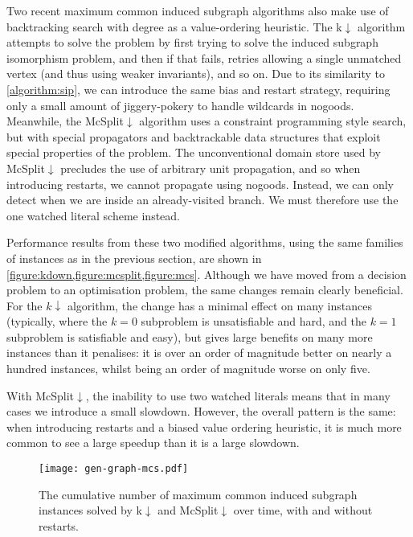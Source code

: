 \documentclass{article}
\newcommand{\citep}[1]{\cite{#1}}
\begin{document}
Two recent maximum common induced subgraph algorithms also make use of backtracking search with
degree as a value-ordering heuristic. The k${\downarrow}$ algorithm
\citep{DBLP:conf/aaai/HoffmannMR17} attempts to solve the problem by first trying to solve the
induced subgraph isomorphism problem, and then if that fails, retries allowing a single unmatched
vertex (and thus using weaker invariants), and so on. Due to its similarity to \cref{algorithm:sip},
we can introduce the same bias and restart strategy, requiring only a small amount of jiggery-pokery
to handle wildcards in nogoods.  Meanwhile, the McSplit${\downarrow}$ algorithm
\citep{DBLP:conf/ijcai/McCreeshPT17} uses a constraint programming style search, but with special
propagators and backtrackable data structures that exploit special properties of the problem. The
unconventional domain store used by McSplit${\downarrow}$ precludes the use of arbitrary unit propagation, and so
when introducing restarts, we cannot propagate using nogoods.  Instead, we can only detect when we
are inside an already-visited branch.  We must therefore use the one watched literal scheme instead.

Performance results from these two modified algorithms, using the same families of instances as in
the previous section, are shown in \cref{figure:kdown,figure:mcsplit,figure:mcs}. Although we have
moved from a decision problem to an optimisation problem, the same changes remain clearly
beneficial. For the $k{\downarrow}$ algorithm, the change has a minimal effect on many instances
(typically, where the $k = 0$ subproblem is unsatisfiable and hard, and the $k = 1$ subproblem is
satisfiable and easy), but gives large benefits on many more instances than it penalises: it is over
an order of magnitude better on nearly a hundred instances, whilst being an order of magnitude worse
on only five.

With McSplit${\downarrow}$, the inability to use two watched literals means that in many cases we
introduce a small slowdown. However, the overall pattern is the same: when introducing restarts and
a biased value ordering heuristic, it is much more common to see a large speedup than it is a large
slowdown.

\begin{figure}[p]
    \centering
    \texttt{[image: gen-graph-mcs.pdf]}
    \caption{The cumulative number of maximum common induced subgraph instances solved by
    k${\downarrow}$ and McSplit${\downarrow}$ over time, with and without restarts.}\label{figure:mcs}
\end{figure}
\end{document}
